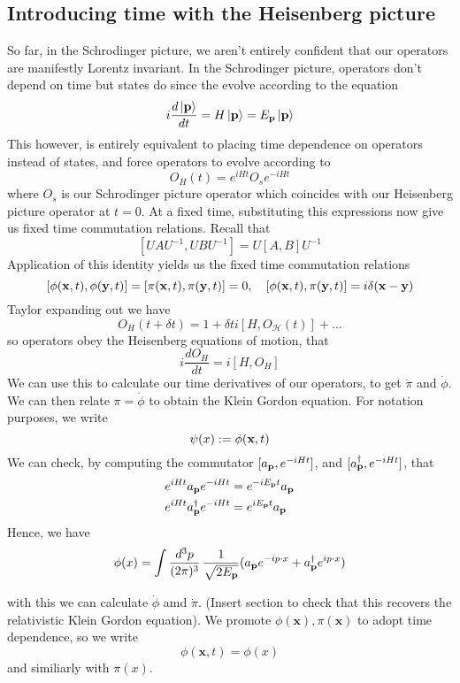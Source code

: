 \subsection{Introducing time with the Heisenberg picture}
So far, in the Schrodinger picture, we aren't entirely confident that our operators are manifestly Lorentz invariant. In the Schrodinger picture, operators don't depend on time but states do since the evolve according to the equation 
\[	 
i \frac{ d \ket{ \mathbf{  p  } } }{ dt }  = H \ket { \mathbf{  p } }  = E_{\mathbf{  p  }} \ket{ \mathbf{  p  } } 
\] This however, is entirely equivalent to placing time dependence on operators instead of states, and force operators to evolve according to 
\[ 	
O_H( t )  = e^{ i H t } O_s   e^{ - i H t } 
\] where $ O_s $ is our Schrodinger picture operator which coincides with our Heisenberg picture operator at $t = 0$. At a fixed time, substituting this expressions now give us fixed time commutation relations. Recall that 
\[ 	
[ U A U^{ - 1}, U BU^{ - 1} ] = U[ A , B ] U^{ -1 } 
\] Application of this identity yields us the fixed time commutation relations 
\[
[ \phi ( \mathbf{  x } , t ), \phi( \mathbf{  y  } , t ) ]  = [ \pi ( \mathbf{  x } , t ) , \pi ( \mathbf{  y }, t ) ] = 0, \quad  [ \phi( \mathbf{  x }, t ), \pi ( \mathbf{  y  }, t ) ] = i \delta ( \mathbf{  x -y  } ) 
\] 
Taylor expanding out we have 
\[
O_H(t + \delta t ) = 1 + \delta t i[H, O_\mathcal{H} ( t) ] + \dots
\]
so operators obey the Heisenberg equations of motion, that 
\[ 	
i \frac{ d O_H}{ dt }  = i [ H, O_H ] 
\] We can use this to calculate our time derivatives of our operators, to get $\dot{ \pi}$ and $\dot{ \phi } $. We can then relate $\pi = \dot{ \phi } $ to obtain the Klein Gordon equation. For notation purposes, we write 
\[ 
\psi ( x) := \phi( \mathbf{  x } , t ) \] 
We can check, by computing the commutator $[ a_{\mathbf{  p  }}, e^{ -i H t } ] $, and $[ a_{\mathbf{  p  }}^\dagger, e^{ -i H t } ] $, that 
\begin{align*} 
e^{i H t} a_{\mathbf{  p  }} e^{ - iH t } &= e^{ - i E_{\mathbf{  p }} t } a_{\mathbf{  p }} \\
e^{i H t} a_{\mathbf{  p  }}^\dagger  e^{ - iH t } &= e^{ i E_{\mathbf{  p }} t } a_{\mathbf{  p }} 
\end{align*}   Hence, we have 
\[
\phi ( x)  = \int \frac{ d^3 p }{ (2 \pi)^3 } \, \frac{ 1 }{ \sqrt { 2 E_{\mathbf{  p  }} } } (a_{ \mathbf{ p }}e^{ -i p \cdot x }  + a^\dagger_{ \mathbf{  p  }} e^{ i p \cdot x } ) 
\] 


with this we can calculate $\dot{\phi}$ amd $\dot{\pi}$. (Insert section to check that this recovers the relativistic Klein Gordon equation). 
We promote $\phi(\mathbf{x}), \pi(\mathbf{x})$
to adopt time dependence, so we write 
\[
\phi(\mathbf{x}, t) = \phi(x) 
\] and similiarly with $\pi(x)$. 

